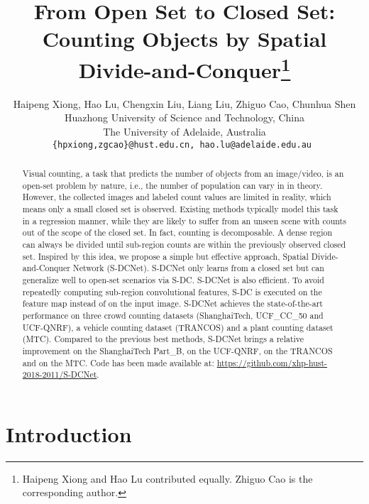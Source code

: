 \documentclass[10pt,twocolumn,letterpaper]{article}
\begin{document}
	
\title{From Open Set to Closed Set: Counting Objects by Spatial Divide-and-Conquer\thanks{
			Haipeng Xiong and Hao Lu contributed equally. Zhiguo Cao is the corresponding author.
		}
	}
	
	\author{Haipeng Xiong, Hao Lu, Chengxin Liu, Liang Liu, Zhiguo Cao, Chunhua Shen\\
		Huazhong University of Science and Technology, China\\
		The University of Adelaide, Australia\\
		{\tt\small \{hpxiong,zgcao\}@hust.edu.cn,  hao.lu@adelaide.edu.au }
\and
}
	
	\maketitle
	\thispagestyle{empty}
	
\begin{abstract}
		


		Visual counting, a task that predicts the number of objects from an image/video, is an open-set problem by nature, i.e., the number of population can vary in  in theory. However, the collected images and labeled count values are limited in reality, which means only a small closed set is observed. Existing methods typically model this task in a regression manner, while they are likely to suffer from an unseen scene with counts out of the scope of the closed set. In fact, counting is decomposable. A dense region can always be divided until sub-region counts are within the previously observed closed set. Inspired by this idea, we propose a simple but effective approach, Spatial Divide-and-Conquer Network (S-DCNet). 
S-DCNet only learns from a closed set but can generalize well to open-set scenarios via S-DC. S-DCNet is also efficient. To avoid repeatedly computing sub-region convolutional features, S-DC is executed on the feature map instead of on the input image.
S-DCNet achieves the state-of-the-art performance on three crowd counting datasets (ShanghaiTech, UCF\_CC\_50 and UCF-QNRF),  a vehicle counting dataset (TRANCOS) and a plant counting dataset (MTC). Compared to the previous best methods, S-DCNet brings a  relative improvement on the ShanghaiTech Part\_B,  on the UCF-QNRF,  on the TRANCOS and  on the MTC. Code has been made available at: \url{https://github.com/xhp-hust-2018-2011/S-DCNet}.
		
	\end{abstract}
	
\section{Introduction}\label{sec:intro}
	
\end{document}
